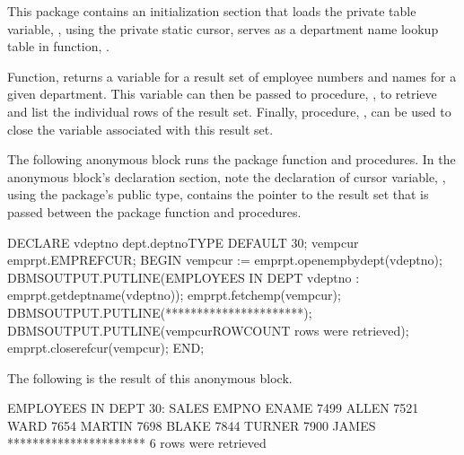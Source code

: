 \documentclass[letterpaper,10pt,english,openany,oneside]{sphinxmanual}
\begin{document}
This package contains an initialization section that loads the private
table variable, , using the private static cursor,  serves as a department name lookup table in function,
.

Function,  returns a  variable for a result
set of employee numbers and names for a given department. This  variable can then be passed to procedure, , to retrieve
and list the individual rows of the result set. Finally, procedure,
, can be used to close the  variable associated
with this result set.

The following anonymous block runs the package function and procedures.
In the anonymous block’s declaration section, note the declaration of
cursor variable, , using the package’s public 
type,  contains the pointer to the result set
that is passed between the package function and procedures.

\newpage

%
\begin{sphinxVerbatim}[commandchars=\\\{\}]
DECLARE
   v\PYGZus{}deptno dept.deptno\PYGZpc{}TYPE DEFAULT 30;
   v\PYGZus{}emp\PYGZus{}cur emp\PYGZus{}rpt.EMP\PYGZus{}REFCUR;
BEGIN
   v\PYGZus{}emp\PYGZus{}cur := emp\PYGZus{}rpt.open\PYGZus{}emp\PYGZus{}by\PYGZus{}dept(v\PYGZus{}deptno);
   DBMS\PYGZus{}OUTPUT.PUT\PYGZus{}LINE(\PYGZsq{}EMPLOYEES IN DEPT \PYGZsh{}\PYGZsq{} \textbar{}\textbar{} v\PYGZus{}deptno \textbar{}\textbar{}
       \PYGZsq{}: \PYGZsq{} \textbar{}\textbar{} emp\PYGZus{}rpt.get\PYGZus{}dept\PYGZus{}name(v\PYGZus{}deptno));
   emp\PYGZus{}rpt.fetch\PYGZus{}emp(v\PYGZus{}emp\PYGZus{}cur);
   DBMS\PYGZus{}OUTPUT.PUT\PYGZus{}LINE(\PYGZsq{}**********************\PYGZsq{});
   DBMS\PYGZus{}OUTPUT.PUT\PYGZus{}LINE(v\PYGZus{}emp\PYGZus{}cur\PYGZpc{}ROWCOUNT \textbar{}\textbar{} \PYGZsq{} rows were
   retrieved\PYGZsq{});
   emp\PYGZus{}rpt.close\PYGZus{}refcur(v\PYGZus{}emp\PYGZus{}cur);
END;
\end{sphinxVerbatim}

The following is the result of this anonymous block.

%
\begin{sphinxVerbatim}[commandchars=\\\{\}]
EMPLOYEES IN DEPT \PYGZsh{}30: SALES
EMPNO ENAME
\PYGZhy{}\PYGZhy{}\PYGZhy{}\PYGZhy{}\PYGZhy{} \PYGZhy{}\PYGZhy{}\PYGZhy{}\PYGZhy{}\PYGZhy{}\PYGZhy{}\PYGZhy{}
7499 ALLEN
7521 WARD
7654 MARTIN
7698 BLAKE
7844 TURNER
7900 JAMES
**********************
6 rows were retrieved
\end{sphinxVerbatim}
\end{document}
